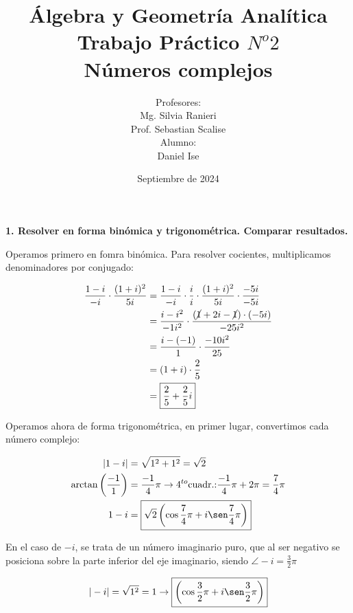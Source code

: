 \documentclass[12pt]{article}
\title{Álgebra y Geometría Analítica\\ Trabajo Práctico $N^{o}2$\\Números complejos}
\author{Profesores:\\Mg. Silvia Ranieri\\Prof. Sebastian Scalise\\Alumno:\\Daniel Ise}
\date{Septiembre de 2024}
\begin{document}
\maketitle

\textbf{1. Resolver en forma binómica y trigonométrica.
    Comparar resultados.}

Operamos primero en fomra binómica.
Para resolver cocientes, multiplicamos denominadores por conjugado:

\begin{align*}
    \frac{1-i}{-i} \cdot \frac{(1+i)^2}{5i} & = \frac{1-i}{-i} \cdot \frac{i}{i} \cdot \frac{(1+i)^2}{5i} \cdot \frac{-5i}{-5i}     \\
                                            & = \frac{i-i^2}{-1i^2} \cdot \frac{(\cancel{1} + 2i - \cancel{1}) \cdot (-5i)}{-25i^2} \\
                                            & = \frac{i-(-1)}{1} \cdot \frac{-10i^2}{25}                                            \\
                                            & = (1+i) \cdot \frac{2}{5}                                                             \\
                                            & = \boxed{\frac{2}{5}+\frac{2}{5}i}                                                    \\
\end{align*}

Operamos ahora de forma trigonométrica,
en primer lugar, convertimos cada número complejo:

\begin{align*}
    |1 - i|                           & = \sqrt{1^2 + 1^2} = \sqrt{2}                                                               \\
    \arctan \left(\frac{-1}{1}\right) & = \frac{-1}{4}\pi \rightarrow 4^{to} \text{cuadr.:} \frac{-1}{4}\pi + 2\pi = \frac{7}{4}\pi \\
    1 - i                             & = \boxed{\sqrt{2}\left(\cos \frac{7}{4}\pi + i \sen \frac{7}{4} \pi\right)}                 \\
\end{align*}

En el caso de \(-i\), se trata de un número imaginario puro,
que al ser negativo se posiciona sobre la parte inferior del eje imaginario,
siendo \(\angle -i = \frac{3}{2}\pi\)

\begin{align*}
    |- i| & = \sqrt{1^2} = 1 \rightarrow \boxed{\left(\cos \frac{3}{2}\pi + i \sen \frac{3}{2} \pi\right)} \\
\end{align*}
\end{document}
